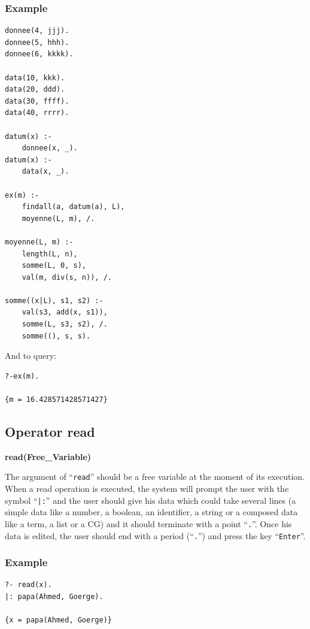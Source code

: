 \documentclass{book}
\begin{document}
\subsubsection{Example}

\begin{verbatim}
donnee(4, jjj).
donnee(5, hhh).
donnee(6, kkkk).

data(10, kkk).
data(20, ddd).
data(30, ffff).
data(40, rrrr).

datum(x) :-
    donnee(x, _).
datum(x) :-
    data(x, _).

ex(m) :-   
    findall(a, datum(a), L),
    moyenne(L, m), /.

moyenne(L, m) :-
    length(L, n),
    somme(L, 0, s),
    val(m, div(s, n)), /.

somme((x|L), s1, s2) :-
    val(s3, add(x, s1)),
    somme(L, s3, s2), /.
    somme((), s, s).
\end{verbatim}

And to query:


\begin{verbatim}
?-ex(m).

{m = 16.428571428571427}
\end{verbatim}



\subsection{Operator read}

{\bf read(Free\_Variable)}

The argument of ``\texttt{read}'' should be a free variable at the
moment of its execution. When a read operation is executed, the system
will prompt the user with the symbol ``\texttt{|:}'' and the user
should give his data which could take several lines (a simple data
like a number, a boolean, an identifier, a string or a composed data
like a term, a list or a CG) and it should terminate with a point
``\texttt{.}''. Once his data is edited, the user should end with a
period (``\texttt{.}'') and press the key ``\texttt{Enter}''.

\subsubsection{Example}


\begin{verbatim}
?- read(x).
|: papa(Ahmed, Goerge).

{x = papa(Ahmed, Goerge)}
\end{verbatim}
\end{document}
